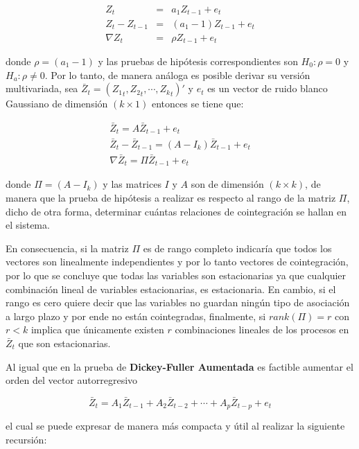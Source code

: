 \begin{eqnarray}
Z_{t} &=& a_1Z_{t-1} + e_t \nonumber \\
Z_{t}- Z_{t-1} &=& (a_1 - 1) Z_{t-1} +e_t \nonumber \\
\nabla Z_t &=& \rho Z_{t-1} + e_t \nonumber
\end{eqnarray}

donde $\rho=(a_1 - 1)$ y las pruebas de hipótesis correspondientes son $H_0: \rho=0$ y $H_a: \rho \neq 0$. Por lo tanto, de manera análoga es posible derivar su versión multivariada, sea $\bar{Z}_t= \left ( {Z_1}_t, {Z_2}_t, \cdots, {Z_k}_t \right )'$ y $e_t$ es un  vector de ruido blanco Gaussiano de dimensión $(k \times 1)$ entonces se tiene que:

\begin{eqnarray}
\bar{Z}_t = A \bar{Z}_{t-1} + e_t \nonumber \\
\bar{Z}_t - \bar{Z}_{t-1}= (A- I_k) \bar{Z}_{t-1} + e_t \\
\nabla \bar{Z}_t = \Pi\bar{Z}_{t-1} + e_t \nonumber 
\end{eqnarray}

donde $\Pi= (A-I_k)$ y las matrices $I$ y $A$ son de dimensión $(k \times k)$, de manera que la prueba de hipótesis a realizar es respecto al rango de la matriz $\Pi$, dicho de otra forma, determinar cuántas relaciones de cointegración se hallan en el sistema.\bigskip 

 En consecuencia, si la matriz $\Pi$ es de rango completo indicaría que todos los vectores son linealmente independientes y por lo tanto vectores de cointegración, por lo que se concluye que todas las variables son estacionarias  ya que cualquier combinación lineal de variables estacionarias, es estacionaria. En cambio, si el rango es cero quiere decir que las variables no guardan ningún tipo de asociación a largo plazo y por ende no están cointegradas, finalmente, si $rank(\Pi)=r$ con $r<k$ implica que únicamente existen $r$ combinaciones lineales de los procesos en $\bar{Z}_t$  que son estacionarias.\bigskip 
 
 Al igual que en la prueba de \textbf{Dickey-Fuller Aumentada} es factible aumentar el orden del vector autorregresivo
 
 \begin{equation}
 \bar{Z}_t= A_1\bar{Z}_{t-1} + A_2\bar{Z}_{t-2}+ \cdots + A_p\bar{Z}_{t-p} +e_t
 \end{equation} 
 
 el cual se puede expresar de manera más compacta y útil al realizar la siguiente recursión:\bigskip 
 
